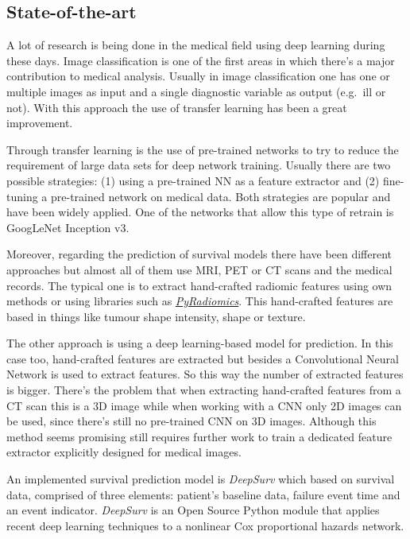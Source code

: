 \subsection{State-of-the-art}

A lot of research is being done in the medical field using deep learning during these days. Image
classification is one of the first areas in which there's a major contribution to medical analysis.
Usually in image classification one has one or multiple images as input and a single diagnostic 
variable as output (e.g.~ill or not). With this approach the use of transfer learning has been a
great improvement.
~\cite{survey-deep-learning}

Through transfer learning is the use of pre-trained networks to try to reduce the requirement of 
large data sets for deep network training. Usually there are two possible strategies: (1) using a 
pre-trained NN as a feature extractor and (2) fine-tuning a pre-trained network on medical data.
Both strategies are popular and have been widely applied. One of the networks that allow this type
of retrain is GoogLeNet Inception v3.
~\cites{GoogLeNet}{NNRetrain}{inceptionRetrain}

Moreover, regarding the prediction of survival models there have been different approaches but
almost all of them use MRI, PET or CT scans and the medical records. The typical one is to extract
hand-crafted radiomic features using own methods or using libraries such as
\href{https://github.com/Radiomics/pyradiomics}{\emph{PyRadiomics}}. This hand-crafted features are
based in things like tumour shape intensity, shape or texture.
~\cites{PyRadiomics}{tumour-radiomics}

The other approach is using a deep learning-based model for prediction. In this case too, 
hand-crafted features are extracted but besides a Convolutional Neural Network is used to extract
features. So this way the number of extracted features is bigger. There's the problem that when
extracting hand-crafted features from a CT scan this is a 3D image while when working with a 
CNN only 2D images can be used, since there's still no pre-trained CNN on 3D images. Although
this method seems promising still requires further work to train a dedicated feature extractor 
explicitly designed for medical images.
~\cite{deep-learning-radiomics-gbm}

An implemented survival prediction model is \emph{DeepSurv} which based on survival data,
comprised of three elements: patient's baseline data, failure event time and an event indicator.
\emph{DeepSurv} is an Open Source Python module that applies recent deep learning techniques to
a nonlinear Cox proportional hazards network. 
~\cite{DeepSurv}

